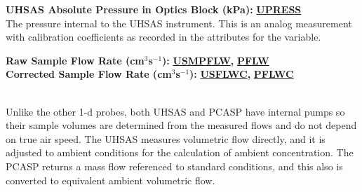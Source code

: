 \begin{hangparagraphs}
\textbf{UHSAS Absolute Pressure in Optics Block (kPa):}\textbf{
}\textbf{\uline{UPRESS}}\\
The pressure internal to the UHSAS instrument. This is an analog measurement
with calibration coefficients as recorded in the attributes for the
variable.\label{punch:7-2}

\noindent\begin{minipage}[t]{1\columnwidth}%
\textbf{Raw Sample Flow Rate (cm$^{3}$s$^{-1}$):}\textbf{
}\textbf{\uline{USMPFLW}}\textbf{, }\textbf{\uline{PFLW}}\\
\textbf{Corrected Sample Flow Rate (cm$^{3}$s$^{-1}$):}\textbf{
}\textbf{\uline{USFLWC}}\textbf{, }\textbf{\uline{PFLWC}}%
\end{minipage}\\
Unlike the other 1-d probes, both UHSAS and PCASP have internal pumps
so their sample volumes are determined from the measured flows and
do not depend on true air speed. The UHSAS measures volumetric flow
directly, and it is adjusted to ambient conditions for the calculation
of ambient concentration. The PCASP returns a mass
flow referenced to standard conditions, and this also is converted
to equivalent ambient volumetric flow.\\
\\
\end{hangparagraphs}
